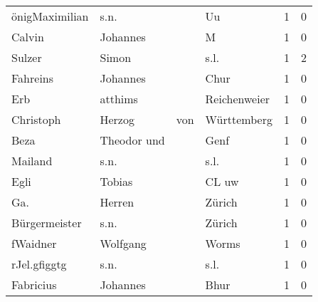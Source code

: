 \begin{tabular}{llllrr}
           önigMaximilian &                               s.n. &             &                                          Uu &          1 &         0 \\
                   Calvin &                           Johannes &             &                                           M &          1 &         0 \\
                   Sulzer &                              Simon &             &                                        s.l. &          1 &         2 \\
                 Fahreins &                           Johannes &             &                                        Chur &          1 &         0 \\
                      Erb &                            atthims &             &                                Reichenweier &          1 &         0 \\
                Christoph &                             Herzog &         von &                                 Württemberg &          1 &         0 \\
                     Beza &                        Theodor und &             &                                        Genf &          1 &         0 \\
                  Mailand &                               s.n. &             &                                        s.l. &          1 &         0 \\
                     Egli &                             Tobias &             &                                       CL uw &          1 &         0 \\
                      Ga. &                             Herren &             &                                      Zürich &          1 &         0 \\
            Bürgermeister &                               s.n. &             &                                      Zürich &          1 &         0 \\
                 fWaidner &                           Wolfgang &             &                                       Worms &          1 &         0 \\
             rJel.gfiggtg &                               s.n. &             &                                        s.l. &          1 &         0 \\
                Fabricius &                           Johannes &             &                                        Bhur &          1 &         0 \\

\end{tabular}
